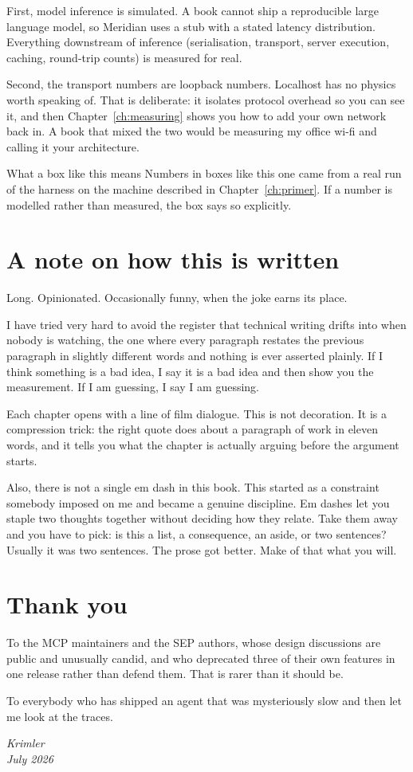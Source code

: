 First, model inference is simulated. A book cannot ship a reproducible large
language model, so Meridian uses a stub with a stated latency distribution.
Everything downstream of inference (serialisation, transport, server execution,
caching, round-trip counts) is measured for real.

Second, the transport numbers are loopback numbers. Localhost has no physics
worth speaking of. That is deliberate: it isolates protocol overhead so you can
see it, and then Chapter~\ref{ch:measuring} shows you how to add your own
network back in. A book that mixed the two would be measuring my office
wi-fi and calling it your architecture.

\begin{measurebox}{What a box like this means}
Numbers in boxes like this one came from a real run of the harness on the
machine described in Chapter~\ref{ch:primer}. If a number is modelled rather
than measured, the box says so explicitly.
\end{measurebox}

\section*{A note on how this is written}

Long. Opinionated. Occasionally funny, when the joke earns its place.

I have tried very hard to avoid the register that technical writing drifts into
when nobody is watching, the one where every paragraph restates the previous
paragraph in slightly different words and nothing is ever asserted plainly. If
I think something is a bad idea, I say it is a bad idea and then show you the
measurement. If I am guessing, I say I am guessing.

Each chapter opens with a line of film dialogue. This is not decoration. It is
a compression trick: the right quote does about a paragraph of work in eleven
words, and it tells you what the chapter is actually arguing before the
argument starts.

Also, there is not a single em dash in this book. This started as a constraint
somebody imposed on me and became a genuine discipline. Em dashes let you
staple two thoughts together without deciding how they relate. Take them away
and you have to pick: is this a list, a consequence, an aside, or two
sentences? Usually it was two sentences. The prose got better. Make of that
what you will.

\section*{Thank you}

To the MCP maintainers and the SEP authors, whose design discussions are public
and unusually candid, and who deprecated three of their own features in one
release rather than defend them. That is rarer than it should be.

To everybody who has shipped an agent that was mysteriously slow and then let
me look at the traces.

\vspace{14pt}
\noindent\emph{Krimler}\\
\emph{July 2026}

\cleardoublepage
